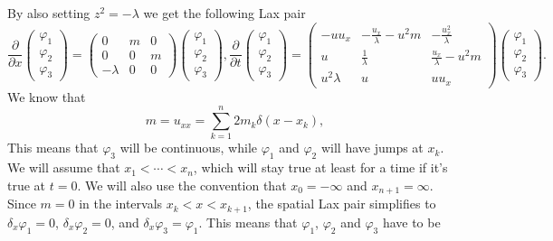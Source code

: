 \documentclass[english,master]{liumaiex}
\theoremstyle{plain}
\theoremstyle{definition}
\begin{document}
By also setting $z^2 = -\lambda$ we get the following Lax pair
\begin{subequations}
\begin{equation}
\frac{\partial}{\partial x}
\begin{pmatrix} \varphi_1 \\ \varphi_2 \\ \varphi_3 \end{pmatrix} =
\begin{pmatrix}
	0 & m & 0 \\
	0 & 0 & m \\
	-\lambda & 0 & 0
\end{pmatrix}
\begin{pmatrix} \varphi_1 \\ \varphi_2 \\ \varphi_3 \end{pmatrix}
,
\end{equation}
\begin{equation}
\frac{\partial}{\partial t}
\begin{pmatrix} \varphi_1 \\ \varphi_2 \\ \varphi_3 \end{pmatrix} =
\begin{pmatrix}
	-u u_x & -\frac{u_x}{\lambda}-u^2 m & -\frac{u_x^2}{\lambda} \\
	u & \frac{1}{\lambda} & \frac{u_x}{\lambda} - u^2 m \\
	u^2\lambda & u & uu_x
\end{pmatrix}
\begin{pmatrix} \varphi_1 \\ \varphi_2 \\ \varphi_3 \end{pmatrix}
.
\end{equation}
\end{subequations}
%
%
We know that
\begin{equation}
	m = u_{xx} = \sum_{k=1}^n 2 m_k \delta(x - x_k),
\end{equation}
This means that $\varphi_3$ will be continuous, while $\varphi_1$ and $\varphi_2$ will have jumps at $x_k$. We will assume that $x_1 < \cdots < x_n$, which will stay true at least for a time if it's true at $t = 0$. We will also use the convention that $x_0 = -\infty$ and $x_{n+1} = \infty$. Since $m = 0$ in the intervals $x_k < x < x_{k+1}$, the spatial Lax pair simplifies to $\delta_x \varphi_1 = 0$, $\delta_x \varphi_2 = 0$, and $\delta_x \varphi_3 = \varphi_1$. This means that $\varphi_1$, $\varphi_2$ and $\varphi_3$ have to be
\end{document}
